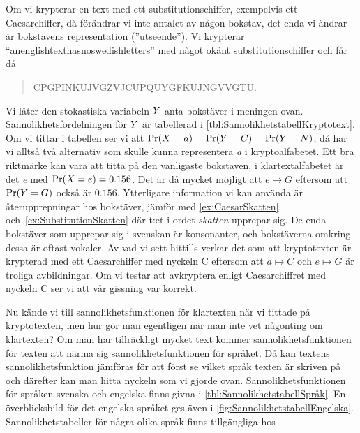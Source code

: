 Om vi krypterar en text med ett substitutionschiffer, exempelvis ett 
Caesarchiffer, då förändrar vi inte antalet av någon bokstav, det enda vi 
ändrar är bokstavens representation (''utseende'').
Vi krypterar \enquote{anenglishtexthasnoswedishletters} med något okänt 
substitutionschiffer och får då
\begin{quote}
  CPGPINKUJVGZVJCUPQUYGFKUJNGVVGTU\@.
\end{quote}
Vi låter den stokastiska variabeln \(\relax{Y}\) anta bokstäver i meningen ovan.
Sannolikhetsfördelningen för \(\relax{Y}\) är tabellerad 
i \cref{tbl:SannolikhetstabellKryptotext}.
Om vi tittar i tabellen ser vi att \(\Pr(\relax{X} = a) = \Pr(\relax{Y} = C) = \Pr(\relax{Y} = N)\), 
då har vi alltså två alternativ som skulle kunna representera \emph{a} 
i kryptoalfabetet.
Ett bra riktmärke kan vara att titta på den vanligaste bokstaven, 
i klartextalfabetet är det \emph{e} med \(\Pr(\relax{X} = e) = 0.156\).
Det är då mycket möjligt att \(e\mapsto G\) eftersom att \(\Pr(\relax{Y} = G)\) också 
är \(0.156\).
Ytterligare information vi kan använda är återupprepningar hos bokstäver,
jämför med \cref{ex:CaesarSkatten} och~\ref{ex:SubstitutionSkatten}
där t:et i ordet \emph{skatten} upprepar sig.
De enda bokstäver som upprepar sig i svenskan är konsonanter, och bokstäverna 
omkring dessa är oftast vokaler.
Av vad vi sett hittills verkar det som att kryptotexten är krypterad med ett 
Caesarchiffer med nyckeln C eftersom att \(a\mapsto C\) och \(e\mapsto G\) är 
troliga avbildningar.
Om vi testar att avkryptera enligt Caesarchiffret med nyckeln C ser vi att vår 
gissning var korrekt.

Nu kände vi till sannolikhetsfunktionen för klartexten när vi tittade på
kryptotexten, men hur gör man egentligen när man inte vet någonting om 
klartexten?
Om man har tillräckligt mycket text kommer sannolikhetsfunktionen för texten att 
närma sig sannolikhetsfunktionen för språket.
Då kan textens sannolikhetsfunktion jämföras för att först se vilket språk 
texten är skriven på och därefter kan man hitta nyckeln som vi gjorde ovan.
Sannolikhetsfunktionen för språken svenska och engelska finns givna i 
\cref{tbl:SannolikhetstabellSpråk}.
En överblicksbild för det engelska språket ges även 
i \cref{fig:SannolikhetstabellEngelska}.
Sannolikhetstabeller för några olika språk finns tillgängliga hos 
\cite{Wikipedia2013lf}.

